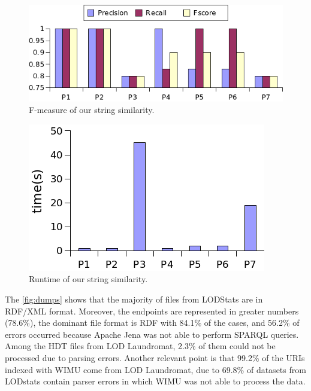 \documentclass[sw]{iosart2x}
\begin{document}
\begin{figure}[htb] 
	\centering
	\includegraphics[width=\linewidth]{img/fmeasure.png}
	\caption{F-measure of our string similarity.}
	\label{fig:fmeasure}
\end{figure}

\begin{figure}[htb] 
	\centering
	\includegraphics[width=\linewidth]{img/runtime.png}
	\caption{Runtime of our string similarity.}
	\label{fig:runtimeSimilarMatch}
\end{figure}

The \cref{fig:dumps} shows that the majority of files from LODStats are in RDF/XML format.
Moreover, the endpoints are represented in greater numbers (78.6\%), the dominant file format is RDF with 84.1\% of the cases, and 56.2\% of errors occurred because Apache Jena was not able to perform SPARQL queries.
Among the HDT files from LOD Laundromat, 2.3\% of them could not be processed due to parsing errors.
Another relevant point is that 99.2\% of the URIs indexed with WIMU come from LOD Laundromat, due to 69.8\% of datasets from LODstats contain parser errors in which WIMU was not able to process the data.
\end{document}
